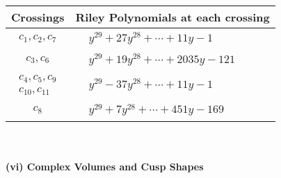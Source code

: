\documentclass[1p]{elsarticle_modified}
\theoremstyle{definition}
\begin{document}
\begin{tabular}{m{50pt}|m{274pt}}
Crossings & \hspace{64pt}Riley Polynomials at each crossing \\
\hline $$\begin{aligned}c_{1},c_{2},c_{7}\end{aligned}$$&$\begin{aligned}
&y^{29}+27 y^{28}+\cdots+11 y-1
\end{aligned}$\\
\hline $$\begin{aligned}c_{3},c_{6}\end{aligned}$$&$\begin{aligned}
&y^{29}+19 y^{28}+\cdots+2035 y-121
\end{aligned}$\\
\hline $$\begin{aligned}c_{4},c_{5},c_{9}\\c_{10},c_{11}\end{aligned}$$&$\begin{aligned}
&y^{29}-37 y^{28}+\cdots+11 y-1
\end{aligned}$\\
\hline $$\begin{aligned}c_{8}\end{aligned}$$&$\begin{aligned}
&y^{29}+7 y^{28}+\cdots+451 y-169
\end{aligned}$\\
\hline
\end{tabular}\\~\\
\newpage\flushleft \textbf{(vi) Complex Volumes and Cusp Shapes}
\end{document}
